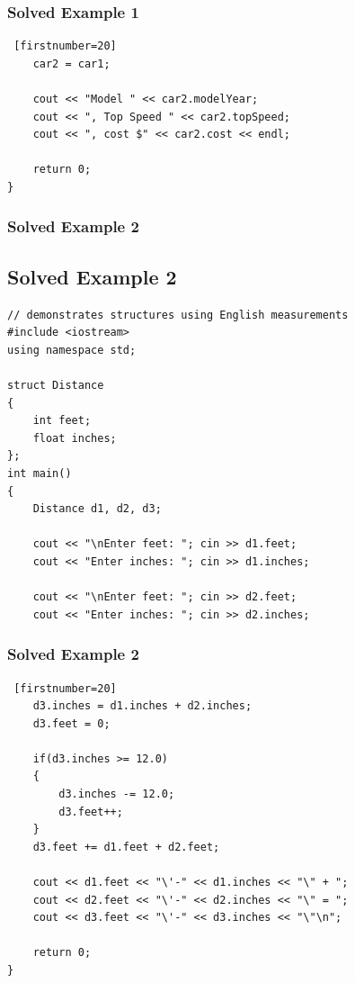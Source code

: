 \documentclass{beamer}
\begin{document}
\begin{frame} [fragile]
    \frametitle{Solved Example 1}
    \lstset{style=mystyle}
\begin{lstlisting} [firstnumber=20]
    car2 = car1;

    cout << "Model " << car2.modelYear;
    cout << ", Top Speed " << car2.topSpeed;
    cout << ", cost $" << car2.cost << endl;

    return 0;
}
\end{lstlisting}
\end{frame}

\begin{frame} [fragile]
    \frametitle{Solved Example 2}
    \subsection{Solved Example 2} %
    \label{sub:solved_example_2}
    \lstset{style=mystyle}
\begin{lstlisting}
// demonstrates structures using English measurements
#include <iostream>
using namespace std;

struct Distance
{
    int feet;
    float inches;
};
int main()
{
    Distance d1, d2, d3;

    cout << "\nEnter feet: "; cin >> d1.feet;
    cout << "Enter inches: "; cin >> d1.inches;
    
    cout << "\nEnter feet: "; cin >> d2.feet;
    cout << "Enter inches: "; cin >> d2.inches;

\end{lstlisting}
\end{frame}

\begin{frame} [fragile]
    \frametitle{Solved Example 2}
    \lstset{style=mystyle}
\begin{lstlisting} [firstnumber=20]
    d3.inches = d1.inches + d2.inches;
    d3.feet = 0;

    if(d3.inches >= 12.0)
    {
        d3.inches -= 12.0;
        d3.feet++;
    }
    d3.feet += d1.feet + d2.feet;

    cout << d1.feet << "\'-" << d1.inches << "\" + ";
    cout << d2.feet << "\'-" << d2.inches << "\" = ";
    cout << d3.feet << "\'-" << d3.inches << "\"\n";

    return 0;
}
\end{lstlisting}
\end{frame}
\end{document}
